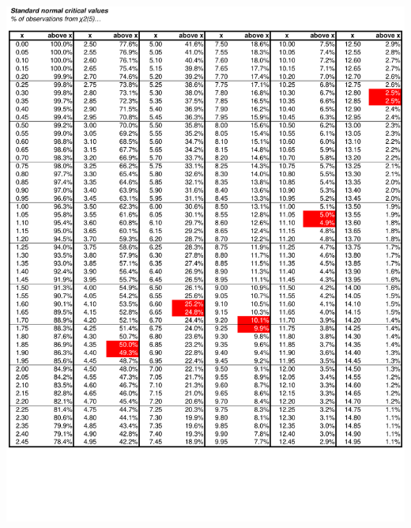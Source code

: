 \documentclass[8pt,letterpaper, landscape]{extarticle} %
\begin{document}
\begin{center}
\includegraphics[height=9.75in, angle=90]{cv7}
\end{center}
\end{document}
